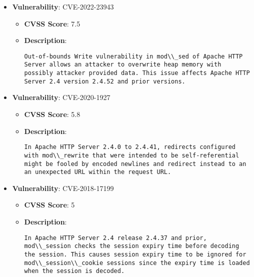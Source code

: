 \documentclass{article}
\begin{document}
\begin{itemize}
        \item \textbf{Vulnerability}: CVE-2022-23943
        \begin{itemize}
            \item \textbf{CVSS Score}:  7.5 
            \item \textbf{Description}:
            \parbox[t]{0.9\linewidth}{
                \verb|Out-of-bounds Write vulnerability in mod\\_sed of Apache HTTP Server allows an attacker to overwrite heap memory with possibly attacker provided data. This issue affects Apache HTTP Server 2.4 version 2.4.52 and prior versions.|
            }
        \end{itemize}
    
        \item \textbf{Vulnerability}: CVE-2020-1927
        \begin{itemize}
            \item \textbf{CVSS Score}:  5.8 
            \item \textbf{Description}:
            \parbox[t]{0.9\linewidth}{
                \verb|In Apache HTTP Server 2.4.0 to 2.4.41, redirects configured with mod\\_rewrite that were intended to be self-referential might be fooled by encoded newlines and redirect instead to an an unexpected URL within the request URL.|
            }
        \end{itemize}
    
        \item \textbf{Vulnerability}: CVE-2018-17199
        \begin{itemize}
            \item \textbf{CVSS Score}:  5 
            \item \textbf{Description}:
            \parbox[t]{0.9\linewidth}{
                \verb|In Apache HTTP Server 2.4 release 2.4.37 and prior, mod\\_session checks the session expiry time before decoding the session. This causes session expiry time to be ignored for mod\\_session\\_cookie sessions since the expiry time is loaded when the session is decoded.|
            }
        \end{itemize}
    

\end{itemize}
\end{document}
